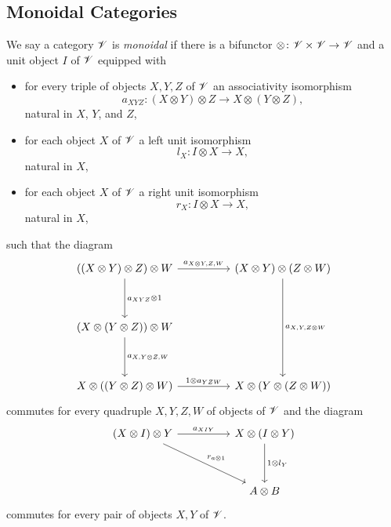 \documentclass[dissertation.tex]{subfiles}
\begin{document}
\subsection{Monoidal Categories}
\begin{defn}
  We say a category $\mathscr{V}$ is {\it monoidal} if there is a bifunctor $\otimes \colon \mathscr{V} \times \mathscr{V} \to \mathscr{V}$ and a unit object $I$ of $\mathscr{V}$ equipped with
  \begin{itemize}
  \item
    for every triple of objects $X, Y, Z$ of $\mathscr{V}$ an associativity isomorphism
    $$a_{XYZ} \colon \left(X \otimes Y\right) \otimes Z \to X \otimes \left(Y \otimes Z\right),$$ 
    natural in $X$, $Y$, and $Z$,
  \item
    for each object $X$ of $\mathscr{V}$ a left unit isomorphism
    $$l_X \colon I \otimes X \to X,$$
    natural in $X$,
  \item
    for each object $X$ of $\mathscr{V}$ a right unit isomorphism
    $$r_X \colon I \otimes X \to X,$$
    natural in $X$,
  \end{itemize}
  such that the diagram
  $$\begin{tikzcd}
    \left(\left(X \otimes Y\right) \otimes Z\right) \otimes W \arrow{rr}{a_{X \otimes Y,Z,W}}\arrow{dd}{a_{XYZ} \otimes 1} && (X \otimes Y) \otimes (Z \otimes W)\arrow{dddd}{a_{X,Y,Z \otimes W}}\\
    \\
    \left(X \otimes \left(Y \otimes Z\right)\right) \otimes W\arrow{dd}{a_{X,Y\otimes Z,W}}\\
    \\
    X \otimes \left(\left(Y \otimes Z\right) \otimes W\right) \arrow{rr}{1 \otimes a_{YZW}}& & X \otimes \left(Y \otimes \left(Z \otimes W\right)\right)
  \end{tikzcd}$$
  commutes for every quadruple $X,Y,Z,W$ of objects of $\mathscr{V}$ and the diagram
  $$\begin{tikzcd}
    (X \otimes I) \otimes Y \arrow{rrdd}{r_{a \otimes 1}}\arrow{rr}{a_{XIY}} && X \otimes (I \otimes Y) \arrow{dd}{1 \otimes l_Y}\\
    \\
    && A \otimes B
  \end{tikzcd}$$
  commutes for every pair of objects $X,Y$ of $\mathscr{V}$.
\end{defn}
\end{document}
